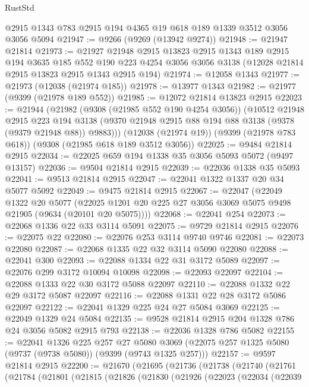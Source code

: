 \begin{lexlean}{RustStd}
\begin{coremodule}
    @2915
    @1343
    @783
    @2915
    @194
    @4365
    @19
    @618
    @189
    @1339
    @3512
    @3056
    @3056
    @5094
@21947 := @9266 (@9269 (@13942 @9274))
@21948 := @21947 @21814
@21973 := @21927
    @21948
    @2915
    @13823
    @2915
    @1343
    @189
    @2915
    @194
    @3635
    @185
    @552
    @190
    @223
    @4254
    @3056
    @3056
    @3138
    (@12028 @21814 @2915 @13823 @2915 @1343 @2915 @194)
@21974 := @12058 @1343
@21977 := @21973 (@12038 (@21974 @185))
@21978 := @13977 @1343
@21982 := @21977 (@9399 (@21978 @189 @552))
@21985 := @12072 @21814 @13823 @2915
@22023 := @21944
    (@21982
      (@9308 (@21985 @552 @190 @4254 @3056))
      (@10512
        @21948
        @2915
        @223
        @194
        @3138
        (@9370 @21948 @2915 @88 @194 @88 @3138 (@9378 (@9379 @21948 @88)) @9883)))
    (@12038 (@21974 @19))
    (@9399 (@21978 @783 @618))
    (@9308 (@21985 @618 @189 @3512 @3056))
@22025 := @9484 @21814 @2915
@22034 := @22025 @659 @194 @1338 @35 @3056 @5093 @5072 (@9497 @13157)
@22036 := @9504 @21814 @2915
@22039 := @22036 @1338 @35 @5093
@22041 := @9513 @21814 @2915
@22047 := @22041 @1322 @1337 @20 @34 @5077 @5092
@22049 := @9475 @21814 @2915
@22067 := @22047
    (@22049
      @1322
      @20
      @5077
      (@22025 @1201 @20 @225 @27 @3056 @3069 @5075 @9498 @21905 (@9634 (@20101 @20 @5075))))
@22068 := @22041 @254
@22073 := @22068 @1336 @22 @33 @3114 @5091
@22075 := @9729 @21814 @2915
@22076 := @22075 @22
@22080 := @22076 @253 @3114 @9740 @9746
@22081 := @22073 @22080
@22087 := @22068 @1335 @22 @32 @3114 @5090 @22080
@22088 := @22041 @300
@22093 := @22088 @1334 @22 @31 @3172 @5089
@22097 := @22076 @299 @3172 @10094 @10098
@22098 := @22093 @22097
@22104 := @22088 @1333 @22 @30 @3172 @5088 @22097
@22110 := @22088 @1332 @22 @29 @3172 @5087 @22097
@22116 := @22088 @1331 @22 @28 @3172 @5086 @22097
@22122 := @22041 @1329 @225 @24 @27 @5084 @3069
@22125 := @22049 @1329 @24 @5084
@22135 := @9528 @21814 @2915 @204 @1328 @786 @24 @3056 @5082 @2915 @793
@22138 := @22036 @1328 @786 @5082
@22155 := @22041
    @1326
    @225
    @257
    @27
    @5080
    @3069
    (@22075 @257 @1325 @5080 (@9737 (@9738 @5080)) (@9399 (@9743 @1325 @257)))
@22157 := @9597 @21814 @2915
@22200 := @21670
    (@21695
      (@21736
        (@21738
          (@21740
            (@21761
              (@21784
                (@21801
                  (@21815
                    (@21826
                      (@21830
                        (@21926
                          (@22023
                            (@22034
                              (@22039

\end{coremodule}
\end{lexlean}
